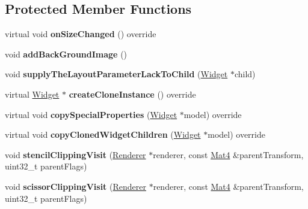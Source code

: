\subsection*{Protected Member Functions}
\begin{DoxyCompactItemize}
\item 
\mbox{\label{classui_1_1Layout_a58a10d14da562392611e96d7e049ab11}} 
virtual void {\bfseries on\+Size\+Changed} () override
\item 
\mbox{\label{classui_1_1Layout_ab7ba2e118264f125c2c6c605da729f86}} 
void {\bfseries add\+Back\+Ground\+Image} ()
\item 
\mbox{\label{classui_1_1Layout_a617ae9c48b13a68f5b8e37f4e56cd891}} 
void {\bfseries supply\+The\+Layout\+Parameter\+Lack\+To\+Child} (\hyperlink{classui_1_1Widget}{Widget} $\ast$child)
\item 
\mbox{\label{classui_1_1Layout_a2f3732bad1c5c861bcbdce340867d11a}} 
virtual \hyperlink{classui_1_1Widget}{Widget} $\ast$ {\bfseries create\+Clone\+Instance} () override
\item 
\mbox{\label{classui_1_1Layout_a2dee0397012dfa29a5e262fc90fd104a}} 
virtual void {\bfseries copy\+Special\+Properties} (\hyperlink{classui_1_1Widget}{Widget} $\ast$model) override
\item 
\mbox{\label{classui_1_1Layout_a1ebc06a882fc42b63b2d373d949f3605}} 
virtual void {\bfseries copy\+Cloned\+Widget\+Children} (\hyperlink{classui_1_1Widget}{Widget} $\ast$model) override
\item 
\mbox{\label{classui_1_1Layout_ad510882071e1da7fc16f7da109afaf6f}} 
void {\bfseries stencil\+Clipping\+Visit} (\hyperlink{classRenderer}{Renderer} $\ast$renderer, const \hyperlink{classMat4}{Mat4} \&parent\+Transform, uint32\+\_\+t parent\+Flags)
\item 
\mbox{\label{classui_1_1Layout_a4e8b945c8cf94046686c2751ae3ed48b}} 
void {\bfseries scissor\+Clipping\+Visit} (\hyperlink{classRenderer}{Renderer} $\ast$renderer, const \hyperlink{classMat4}{Mat4} \&parent\+Transform, uint32\+\_\+t parent\+Flags)

\end{DoxyCompactItemize}
